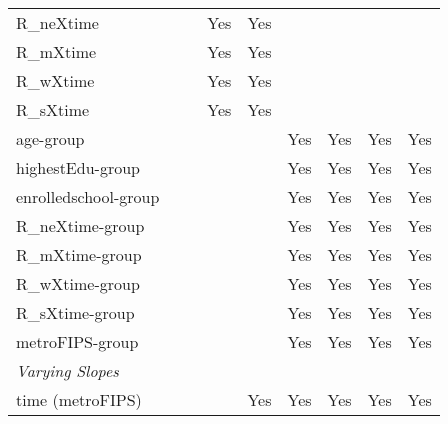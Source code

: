 \begin{tabular}{lcccccccc}
   R\_neXtime               &                 &                 & Yes             & Yes             &                &                &                & \\  
   R\_mXtime                &                 &                 & Yes             & Yes             &                &                &                & \\  
   R\_wXtime                &                 &                 & Yes             & Yes             &                &                &                & \\  
   R\_sXtime                &                 &                 & Yes             & Yes             &                &                &                & \\  
   age-group                &                 &                 &                 &                 & Yes            & Yes            & Yes            & Yes\\  
   highestEdu-group         &                 &                 &                 &                 & Yes            & Yes            & Yes            & Yes\\  
   enrolledschool-group     &                 &                 &                 &                 & Yes            & Yes            & Yes            & Yes\\  
   R\_neXtime-group         &                 &                 &                 &                 & Yes            & Yes            & Yes            & Yes\\  
   R\_mXtime-group          &                 &                 &                 &                 & Yes            & Yes            & Yes            & Yes\\  
   R\_wXtime-group          &                 &                 &                 &                 & Yes            & Yes            & Yes            & Yes\\  
   R\_sXtime-group          &                 &                 &                 &                 & Yes            & Yes            & Yes            & Yes\\  
   metroFIPS-group          &                 &                 &                 &                 & Yes            & Yes            & Yes            & Yes\\  
   \midrule
   \emph{Varying Slopes}\\
   time (metroFIPS)         &                 &                 &                 & Yes             & Yes            & Yes            & Yes            & Yes\\  

\end{tabular}
